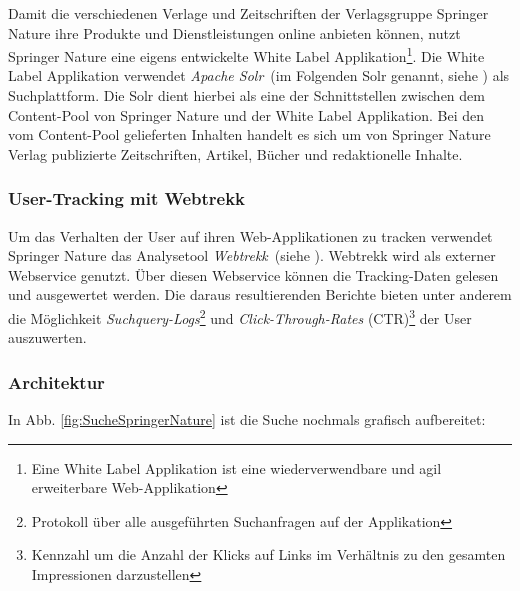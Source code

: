 Damit die verschiedenen Verlage und Zeitschriften der Verlagsgruppe Springer Nature ihre Produkte und Dienstleistungen online anbieten können, nutzt Springer Nature eine eigens entwickelte White Label Applikation\footnote{Eine White Label Applikation ist eine wiederverwendbare und agil erweiterbare Web-Applikation}. Die White Label Applikation verwendet \textit{Apache Solr}~(im Folgenden \glqq Solr\grqq{} genannt, siehe \cite{solr}) als Suchplattform. Die Solr dient hierbei als eine der Schnittstellen zwischen dem Content-Pool von Springer Nature und der White Label Applikation. Bei den vom Content-Pool gelieferten Inhalten handelt es sich um von Springer Nature Verlag publizierte Zeitschriften, Artikel, Bücher und redaktionelle Inhalte.

\subsubsection{User-Tracking mit Webtrekk}
\label{sec:Einfuehrung:AufbauSucheBeiSpringerNature:Webtrekk}

Um das Verhalten der User auf ihren Web-Applikationen zu tracken verwendet Springer Nature das Analysetool \textit{Webtrekk}~(siehe \cite{webtrekk}). Webtrekk wird als externer Webservice genutzt. Über diesen Webservice können die Tracking-Daten gelesen und ausgewertet werden. Die daraus resultierenden Berichte bieten unter anderem die Möglichkeit \textit{Suchquery-Logs}\footnote{Protokoll über alle ausgeführten Suchanfragen auf der Applikation} und \textit{Click-Through-Rates} (CTR)\footnote{Kennzahl um die Anzahl der Klicks auf Links im Verhältnis zu den gesamten Impressionen darzustellen} der User auszuwerten.

\pagebreak

\subsubsection{Architektur}
\label{sec:Einfuehrung:AufbauSucheBeiSpringerNature:Architektur}

In Abb. \ref{fig:SucheSpringerNature} ist die Suche nochmals grafisch aufbereitet:

